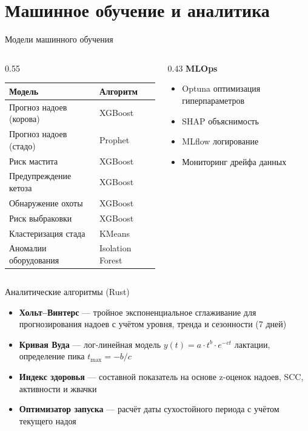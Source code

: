 \documentclass[aspectratio=169, 12pt]{beamer}
\begin{document}
\section{Машинное обучение и аналитика}

\begin{frame}{Модели машинного обучения}
  \begin{columns}[T]
    \begin{column}{0.55\textwidth}
      \small
      \begin{tabular}{ll}
        \toprule
        \textbf{Модель} & \textbf{Алгоритм} \\
        \midrule
        Прогноз надоев (корова) & XGBoost \\
        Прогноз надоев (стадо) & Prophet \\
        Риск мастита & XGBoost \\
        Предупреждение кетоза & XGBoost \\
        Обнаружение охоты & XGBoost \\
        Риск выбраковки & XGBoost \\
        Кластеризация стада & KMeans \\
        Аномалии оборудования & Isolation Forest \\
        \bottomrule
      \end{tabular}
    \end{column}
    \begin{column}{0.43\textwidth}
      \textbf{MLOps}
      \begin{itemize}\small
        \item Optuna оптимизация гиперпараметров
        \item SHAP объяснимость
        \item MLflow логирование
        \item Мониторинг дрейфа данных
      \end{itemize}
    \end{column}
  \end{columns}
\end{frame}

\begin{frame}{Аналитические алгоритмы (Rust)}
  \begin{itemize}
    \item \textbf{Хольт--Винтерс} --- тройное экспоненциальное сглаживание для прогнозирования надоев с учётом уровня, тренда и сезонности (7 дней)
    \item \textbf{Кривая Вуда} --- лог-линейная модель $y(t) = a \cdot t^b \cdot e^{-ct}$ лактации, определение пика $t_{\max} = -b/c$
    \item \textbf{Индекс здоровья} --- составной показатель на основе z-оценок надоев, SCC, активности и жвачки
    \item \textbf{Оптимизатор запуска} --- расчёт даты сухостойного периода с учётом текущего надоя
  \end{itemize}
\end{frame}
\end{document}
